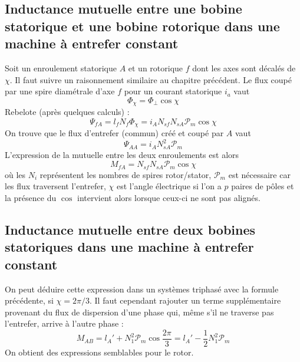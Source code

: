 	\subsection{Inductance mutuelle entre une bobine statorique et une bobine rotorique 
	dans une machine à entrefer constant}
	Soit un enroulement statorique $A$ et un rotorique $f$ dont les axes sont 
	décalés de $\chi$. Il faut suivre un raisonnement similaire au chapitre précédent. 
	Le flux coupé par une spire diamétrale d'axe $f$ pour un courant statorique $i_a$ 
	vaut
	\begin{equation}
	\Phi_\chi = \Phi_\perp\cos\chi
	\end{equation}
	Rebelote (après quelques calculs) :
	\begin{equation}
	\Psi_{fA} = l_fN_f\Phi_\chi =  i_AN_{sf}N_{sA}\mathcal{P}_m\cos\chi
	\end{equation}
	On trouve que le flux d'entrefer (commun) créé et 	coupé par $A$ vaut 
	\begin{equation}
	\Psi_{AA} = i_AN_{sA}^2\mathcal{P}_m
	\end{equation}
	L'expression de la mutuelle entre les deux enroulements est alors
	\begin{equation}
	M_{fA} = N_{sf}N_{sA}\mathcal{P}_m\cos\chi
	\end{equation}
	où les $N_i$ représentent les nombres de spires rotor/stator, $\mathcal{P}_m$ 
	est nécessaire car les flux traversent l'entrefer, $\chi$ est l'angle 
	électrique si l'on a $p$ paires de pôles et la présence du $\cos$ intervient 
	alors lorsque ceux-ci ne sont pas alignés.
	
	\subsection{Inductance mutuelle entre deux bobines statoriques dans une machine 
	à entrefer constant}	
	On peut déduire cette expression dans un systèmes triphasé avec la formule 
	précédente, si $\chi=2\pi/3$. Il faut cependant rajouter un terme supplémentaire 
	provenant du flux de dispersion d'une phase qui, même s'il ne traverse pas 
	l'entrefer, arrive à l'autre phase :
	\begin{equation}
	M_{AB} = l_A'+N_1^2\mathcal{P}_m\cos\dfrac{2\pi}{3} = l_A'-\dfrac{1}{2}N_1^2
	\mathcal{P}_m
	\end{equation}
	On obtient des expressions semblables pour le rotor.
	
